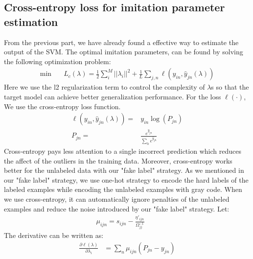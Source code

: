\subsection{Cross-entropy loss for imitation parameter estimation}
From the previous part, we have already found a effective way to estimate the output of the SVM. The optimal imitation parameters, can be found by solving the following optimization problem:
\begin{equation}\label{eq:loo_loss}
\begin{aligned}
\min \quad& L_c\left(\lambda\right)=\frac{1}{2}\sum_i^M||\lambda_i||^2+\frac{1}{L}\sum_{j,n}\ell\left(y_{in},\hat{y}_{jn}\left(\lambda\right)\right)
\end{aligned}
\end{equation}
Here we use the l2 regularization term to control the complexity of $\lambda$s so that the target model can achieve better generalization performance. For the loss $\ell(\cdot)$, We use the cross-entropy loss function.
\begin{equation}\label{eq:ce}
\begin{aligned}
\ell\left(y_{in},\hat{y}_{jn}\left(\lambda\right)\right)=&y_{in}\log(P_{jn})\\
P_{jn} =& \frac{e^{\hat{y}_{jn}}}{\sum_{h} e^{\hat{y}_{jh}}}
\end{aligned}
\end{equation}
Cross-entropy pays less attention to a single incorrect prediction which reduces the affect of the outliers in the training data. Moreover, cross-entropy works better for the unlabeled data with our "fake label" strategy. As we mentioned in our "fake label" strategy, we use one-hot strategy to encode the hard labels of the labeled examples while encoding the unlabeled examples with gray code. When we use cross-entropy, it can automatically ignore penalties of the unlabeled examples and reduce the noise introduced by our "fake label" strategy. 
Let:
\begin{equation}\label{eq:mu}
\begin{aligned}
\mu_{ijn}=s_{ijn}-\frac{{\eta}'_{ijn}}{\Omega_{jj}^{-1}} \qquad
\end{aligned}
\end{equation}
The derivative can be written as:
\begin{equation}\label{eq:p}
\begin{aligned}
\frac{\partial \ell(\lambda)}{\partial \lambda_i}&=\sum_n\mu_{ijn}\left(P_{jn}-{y}_{jn}\right)
\end{aligned}
\end{equation}
